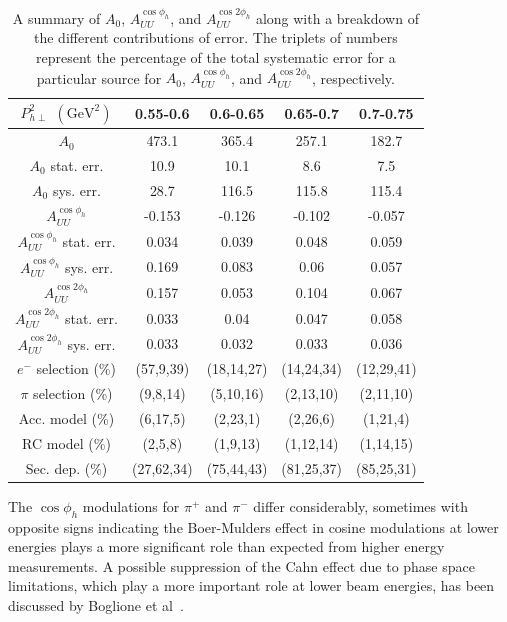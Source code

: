 \documentclass[aps,prl,twocolumn,showpacs,superscriptaddress,groupedaddress]{revtex4-1}  %
\begin{document}
\begin{table}
\begin{center}
\begin{tabular}{ |c||c|c|c|c| } 

  \hline
  $P_{h\perp}^2$ $(\text{GeV}^2)$ & 0.55-0.6 & 0.6-0.65 & 0.65-0.7 & 0.7-0.75 \\
  \hline
  \hline
  $A_0$ & 473.1 & 365.4 & 257.1 & 182.7 \\
  \hline
  $A_0$ stat. err. & 10.9 & 10.1 & 8.6 & 7.5 \\
  \hline
  $A_0$ sys. err. & 28.7 & 116.5 & 115.8 & 115.4 \\
  \hline
  $A_{UU}^{\cos \phi_h}$ & -0.153 & -0.126 & -0.102 & -0.057 \\
  \hline
  $A_{UU}^{\cos \phi_h}$ stat. err. & 0.034 & 0.039 & 0.048 & 0.059 \\
  \hline
  $A_{UU}^{\cos \phi_h}$ sys. err. & 0.169 & 0.083 & 0.06 & 0.057 \\
  \hline
  $A_{UU}^{\cos 2 \phi_h}$ & 0.157 & 0.053 & 0.104 & 0.067 \\
  \hline
  $A_{UU}^{\cos 2 \phi_h}$ stat. err. & 0.033 & 0.04 & 0.047 & 0.058 \\
  \hline
  $A_{UU}^{\cos 2 \phi_h}$ sys. err. & 0.033 & 0.032 & 0.033 & 0.036 \\
  \hline
  $e^-$ selection (\%) & (57,9,39) & (18,14,27) & (14,24,34) & (12,29,41) \\
  \hline
  $\pi$ selection (\%) & (9,8,14) & (5,10,16) & (2,13,10) & (2,11,10) \\
  \hline
  Acc. model (\%) & (6,17,5) & (2,23,1) & (2,26,6) & (1,21,4) \\
  \hline
  RC model (\%) & (2,5,8) & (1,9,13) & (1,12,14) & (1,14,15) \\
  \hline
  Sec. dep. (\%) & (27,62,34) & (75,44,43) & (81,25,37) & (85,25,31) \\
  \hline

\end{tabular}
\end{center}
\caption{A summary of $A_0$, $A_{UU}^{\cos \phi_h}$, and $A_{UU}^{\cos 2 \phi_h}$ along with a breakdown of the different contributions of error. The triplets of numbers represent the percentage of the total systematic error for a particular source for $A_0$, $A_{UU}^{\cos \phi_h}$, and $A_{UU}^{\cos 2 \phi_h}$, respectively.}
\label{tab:A0AcAcc_PT2bins_x1QQ1z8}
\end{table}

The $\cos \phi_h$ modulations for $\pi^+$ and $\pi^-$ differ considerably, sometimes with opposite signs indicating the Boer-Mulders effect in cosine modulations at lower energies plays a more significant role than expected from higher energy measurements.
A possible suppression of the Cahn effect due to phase space limitations, which play a more important role at lower beam energies, has been discussed by Boglione et al~\cite{Boglione:2011wm}.
\end{document}
